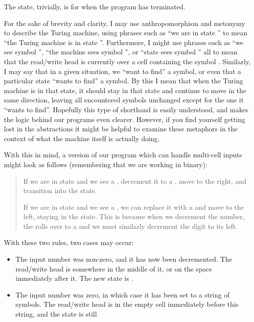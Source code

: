 The  state, trivially, is for when the program has terminated.

For the sake of brevity and clarity, I may use anthropomorphism and metonymy to describe the Turing machine, using phrases such as ``we are in state '' to mean ``the Turing machine is in state ''. Furthermore, I might use phrases such as ``we see symbol '', ``the machine sees symbol '', or ``state  sees symbol '' all to mean that the read/write head is currently over a cell containing the symbol . Similarly, I may say that in a given situation, we ``want to find'' a symbol, or even that a particular state ``wants to find'' a symbol. By this I mean that when the Turing machine is in that state, it should stay in that state and continue to move in the same direction, leaving all encountered symbols unchanged except for the one it ``wants to find''. Hopefully this type of shorthand is easily understood, and makes the logic behind our programs even clearer. However, if you find yourself getting lost in the abstractions it might be helpful to examine these metaphors in the context of what the machine itself is actually doing.

With this in mind, a version of our program which can handle multi-cell inputs might look as follows (remembering that we are working in binary):

\begin{quote}
    If we are in state  and we see a , decrement it to a , move to the right, and transition into the  state.
    
    If we are in state  and we see a , we can replace it with a  and move to the left, staying in the  state. This is because when we decrement the number, the  rolls over to a  and we must similarly decrement the digit to its left.
\end{quote}

With these two rules, two cases may occur:
\begin{itemize}
    \item The input number was non-zero, and it has now been decremented. The read/write head is somewhere in the middle of it, or on the space immediately after it. The new state is .
    
    \item The input number was zero, in which case it has been set to a string of  symbols. The read/write head is in the empty cell immediately before this string, and the state is still 
\end{itemize}

